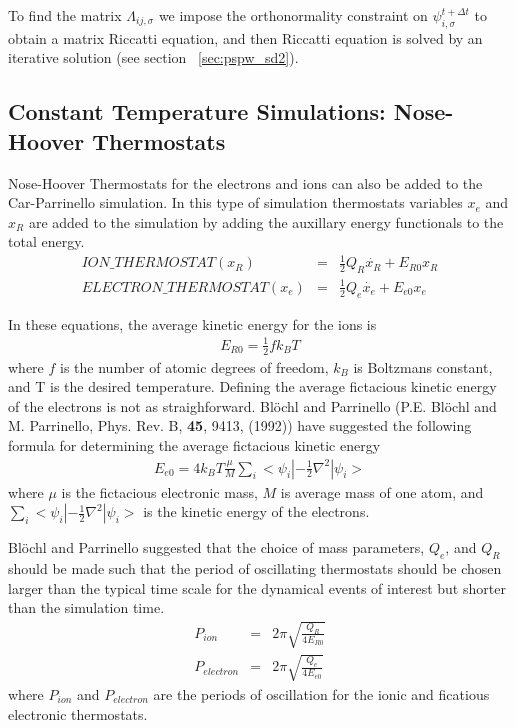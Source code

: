 \noindent
To find the matrix $\Lambda_{ij,\sigma}$ we impose the orthonormality
constraint on $\psi_{i,\sigma}^{t+\Delta t}$ to obtain a
matrix Riccatti equation, and then Riccatti equation is solved by an iterative
solution (see section ~\ref{sec:pspw_sd2}).


\subsection{Constant Temperature Simulations: Nose-Hoover Thermostats}
\label{sec:pspw_nose}

Nose-Hoover Thermostats for the electrons and ions can also be added to the 
Car-Parrinello simulation.  In this type of simulation thermostats variables $x_e$ and $x_R$ 
are added to the simulation by adding the auxillary energy functionals to the total energy.
\begin{eqnarray}
ION\_THERMOSTAT(x_R)      &=&  \frac{1}{2} Q_R \dot{x_R} + E_{R0}x_R \\ 
ELECTRON\_THERMOSTAT(x_e) &=&  \frac{1}{2} Q_e \dot{x_e} + E_{e0}x_e 
\end{eqnarray}

In these equations, the average kinetic energy for the ions is
\begin{eqnarray}
E_{R0} = \frac{1}{2} f k_B T
\end{eqnarray}
where $f$ is the number of atomic degrees of freedom, $k_B$ is 
Boltzmans constant, and T is the desired temperature.  Defining
the average fictacious kinetic energy of the electrons is not as straighforward.
Bl\"{o}chl and Parrinello 
(P.E. Bl\"{o}chl and M. Parrinello, Phys. Rev. B, \textbf{45}, 9413, (1992)) 
have suggested the following formula for determining
the average fictacious kinetic energy
\begin{eqnarray}
E_{e0} = 4 k_B T \frac{\mu}{M} \sum_i <\psi_i|-\frac{1}{2} \nabla^2 |\psi_i>
\end{eqnarray}
where $\mu$ is the fictacious electronic mass, $M$ is average mass of one atom,
and $\sum_i <\psi_i|-\frac{1}{2} \nabla^2 |\psi_i>$ is the kinetic energy of the
electrons.

Bl\"{o}chl and Parrinello suggested that the choice of mass parameters, 
$Q_e$, and $Q_R$ should be made such that the period of oscillating thermostats 
should be chosen larger than the typical time scale for the dynamical events of 
interest but shorter than the simulation time.  
\begin{eqnarray}
P_{ion} &=& 2\pi \sqrt{\frac{Q_R}{4E_{R0}}}\\
P_{electron} &=& 2\pi \sqrt{\frac{Q_e}{4E_{e0}}}
\end{eqnarray}
where $P_{ion}$ and $P_{electron}$ are the periods of oscillation for the ionic and ficatious
electronic thermostats.  




